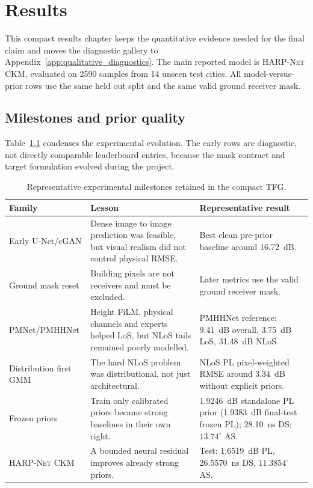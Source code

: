 \chapter{Results}
\label{chap:results}

This compact results chapter keeps the quantitative evidence needed for the
final claim and moves the diagnostic gallery to Appendix~\ref{app:qualitative_diagnostics}.
The main reported model is \textsc{HARP-Net CKM},
evaluated on 2590 samples from 14 unseen test cities. All model-versus-prior
rows use the same held out split and the same valid ground receiver mask.

\section{Milestones and prior quality}

Table~\ref{tab:timeline_results} condenses the experimental evolution. The
early rows are diagnostic, not directly comparable leaderboard entries, because
the mask contract and target formulation evolved during the project.

\begin{table}[htbp]
\centering
\caption{Representative experimental milestones retained in the compact TFG.}
\label{tab:timeline_results}
\scriptsize
\setlength{\tabcolsep}{3pt}
\begin{tabularx}{\textwidth}{p{}p{}X}
\toprule
Family & Lesson & Representative result \\
\midrule
Early U-Net/cGAN & Dense image to image prediction was feasible, but visual realism did not control physical RMSE. & Best clean pre-prior baseline around \SI{16.72}{dB}. \\
Ground mask reset & Building pixels are not receivers and must be excluded. & Later metrics use the valid ground receiver mask. \\
PMNet/PMHHNet & Height FiLM, physical channels and experts helped LoS, but NLoS tails remained poorly modelled. & PMHHNet reference: \SI{9.41}{dB} overall, \SI{3.75}{dB} LoS, \SI{31.48}{dB} NLoS. \\
Distribution first GMM & The hard NLoS problem was distributional, not just architectural. & NLoS PL pixel-weighted RMSE around \SI{3.34}{dB} without explicit priors. \\
Frozen priors & Train only calibrated priors became strong baselines in their own right. & \SI{1.9246}{dB} standalone PL prior (\SI{1.9383}{dB} final-test frozen PL); \SI{28.10}{ns} DS; \(13.74^\circ\) AS. \\
\textsc{HARP-Net CKM} & A bounded neural residual improves already strong priors. & Test: \SI{1.6519}{dB} PL, \SI{26.5570}{ns} DS, \(11.3854^\circ\) AS. \\
\bottomrule
\end{tabularx}
\end{table}

